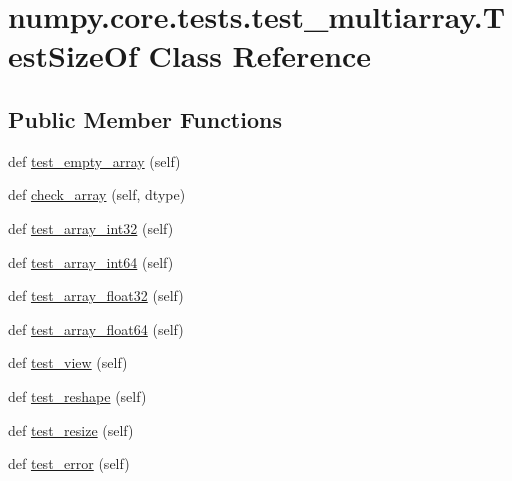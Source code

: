 \hypertarget{classnumpy_1_1core_1_1tests_1_1test__multiarray_1_1TestSizeOf}{}\section{numpy.\+core.\+tests.\+test\+\_\+multiarray.\+Test\+Size\+Of Class Reference}
\label{classnumpy_1_1core_1_1tests_1_1test__multiarray_1_1TestSizeOf}
\subsection*{Public Member Functions}
\begin{DoxyCompactItemize}
\item 
def \hyperlink{classnumpy_1_1core_1_1tests_1_1test__multiarray_1_1TestSizeOf_a70abfd1a23413905333a395a9d386d6c}{test\+\_\+empty\+\_\+array} (self)
\item 
def \hyperlink{classnumpy_1_1core_1_1tests_1_1test__multiarray_1_1TestSizeOf_abf68dd334bb1c4048513ea4d497ef0e7}{check\+\_\+array} (self, dtype)
\item 
def \hyperlink{classnumpy_1_1core_1_1tests_1_1test__multiarray_1_1TestSizeOf_a1192e7bc5388e9f728cbd8801641ab42}{test\+\_\+array\+\_\+int32} (self)
\item 
def \hyperlink{classnumpy_1_1core_1_1tests_1_1test__multiarray_1_1TestSizeOf_a908735c9b483b1527d3f06b02c2f2a93}{test\+\_\+array\+\_\+int64} (self)
\item 
def \hyperlink{classnumpy_1_1core_1_1tests_1_1test__multiarray_1_1TestSizeOf_a9631742d7d905e07a1048df8b33058ab}{test\+\_\+array\+\_\+float32} (self)
\item 
def \hyperlink{classnumpy_1_1core_1_1tests_1_1test__multiarray_1_1TestSizeOf_a798ce768d3badb437af8c47efc3895d6}{test\+\_\+array\+\_\+float64} (self)
\item 
def \hyperlink{classnumpy_1_1core_1_1tests_1_1test__multiarray_1_1TestSizeOf_ae9eb4d173919934db1f4b2f35336d5bb}{test\+\_\+view} (self)
\item 
def \hyperlink{classnumpy_1_1core_1_1tests_1_1test__multiarray_1_1TestSizeOf_a491dc3ffdf1105f8bd015b59ddf08c8e}{test\+\_\+reshape} (self)
\item 
def \hyperlink{classnumpy_1_1core_1_1tests_1_1test__multiarray_1_1TestSizeOf_a6c7ea648f2605f3121ab9bdc0f89bfdf}{test\+\_\+resize} (self)
\item 
def \hyperlink{classnumpy_1_1core_1_1tests_1_1test__multiarray_1_1TestSizeOf_a8bfc77ad35ad05e58b5baf726960e449}{test\+\_\+error} (self)
\end{DoxyCompactItemize}


